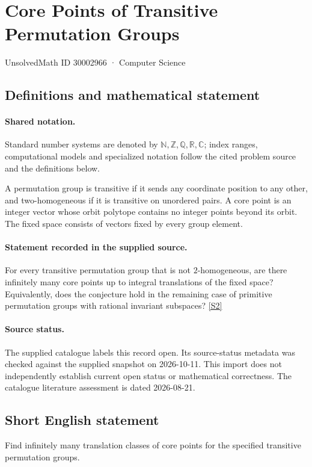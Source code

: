 \documentclass[11pt]{article}
\newcommand{\sref}[2]{\hyperlink{source:#1:#2}{[S#2]}}
\begin{document}
\setcounter{section}{30002965}
\section{Core Points of Transitive Permutation Groups}\label{30002966}
{\small\sffamily UnsolvedMath ID 30002966 · Computer Science}
\subsection{Definitions and mathematical statement}

\paragraph{Shared notation.}Standard number systems are denoted by $\mathbb N,\mathbb Z,\mathbb Q,\mathbb R,\mathbb C$; index ranges, computational models and specialized notation follow the cited problem source and the definitions below.


A permutation group is transitive if it sends any coordinate position to any other, and two-homogeneous if it is transitive on unordered pairs. A core point is an integer vector whose orbit polytope contains no integer points beyond its orbit. The fixed space consists of vectors fixed by every group element.
\paragraph{Statement recorded in the supplied source.}
For every transitive permutation group that is not $2$-homogeneous, are there infinitely many core points up to integral translations of the fixed space? Equivalently, does the conjecture hold in the remaining case of primitive permutation groups with rational invariant subspaces? \sref{30002966}{2}
\paragraph{Source status.}
The supplied catalogue labels this record open. Its source-status metadata was checked against the supplied snapshot on 2026-10-11. This import does not independently establish current open status or mathematical correctness. The catalogue literature assessment is dated 2026-08-21.
\subsection{Short English statement}
Find infinitely many translation classes of core points for the specified transitive permutation groups.
\end{document}
